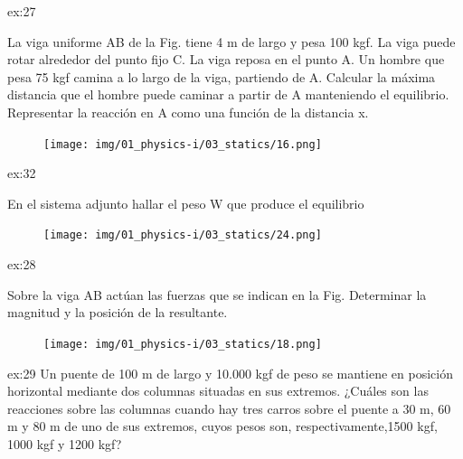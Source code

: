 \begin{multicols}{2}
     \begin{excercise}[][][$x=3.17\ \mathrm{m} $, $R=40\ \mathrm{Kgf}$]{ex:27}{
        La viga uniforme AB de la Fig. tiene 4 m de largo y pesa 100 kgf. La viga puede rotar alrededor del punto fijo C. La viga reposa en el punto A. Un hombre que pesa 75 kgf camina a lo largo de la viga, partiendo de A. Calcular la máxima distancia que el hombre puede caminar a partir de A manteniendo el equilibrio. Representar la reacción en A como una función de la distancia x.   
         \begin{figure}[H]
             \centering
             \texttt{[image: img/01\_physics-i/03\_statics/16.png]}
         \end{figure}
         } 
     \end{excercise}     %
     \begin{excercise}[][][$W=54.6\ \mathrm{N}$]{ex:32}{
       En el sistema adjunto hallar el peso  W que produce el equilibrio 
         \begin{figure}[H]
             \centering
             \texttt{[image: img/01\_physics-i/03\_statics/24.png]}
         \end{figure}
         } 
     \end{excercise}
     \begin{excercise}[][][$R=4170\ \mathrm{N} $, $x=196\ \mathrm{cm}$]{ex:28}{
        Sobre la viga AB actúan las fuerzas que se indican en la Fig. Determinar la magnitud y la posición de la resultante.     
         \begin{figure}[H]
             \centering
             \texttt{[image: img/01\_physics-i/03\_statics/18.png]}
         \end{figure}
         } 
     \end{excercise}
    
     \begin{excercise}[][][$R_A=6690\ \mathrm{Kgf}$, $R_B=7010 \ \mathrm{Kgf}$]{ex:29}{
       Un puente de 100 m de largo y 10.000 kgf de peso se mantiene en posición horizontal mediante dos columnas situadas en sus extremos. ¿Cuáles son las reacciones sobre las columnas cuando hay tres carros sobre el puente a 30 m, 60 m y 80 m de uno de sus extremos, cuyos pesos son, respectivamente,1500 kgf, 1000 kgf y 1200 kgf?     
        }
     \end{excercise} 
    

\end{multicols}
